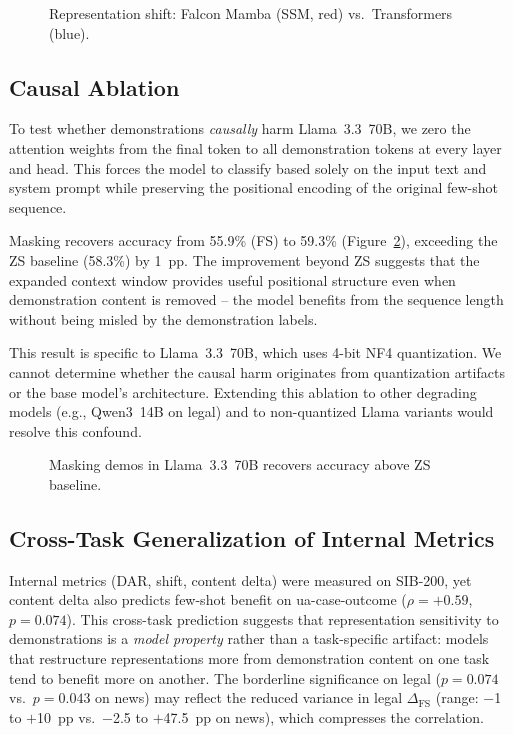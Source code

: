 \documentclass[11pt,a4paper]{article}
\begin{document}
\begin{figure}[t]
\centering

\caption{Representation shift: Falcon Mamba (SSM, red) vs.\ Transformers (blue).}
\label{fig:shift}
\end{figure}

\subsection{Causal Ablation}

To test whether demonstrations \emph{causally} harm Llama~3.3~70B, we zero the attention weights from the final token to all demonstration tokens at every layer and head. This forces the model to classify based solely on the input text and system prompt while preserving the positional encoding of the original few-shot sequence.

Masking recovers accuracy from 55.9\% (FS) to 59.3\% (Figure~\ref{fig:ablation}), exceeding the ZS baseline (58.3\%) by 1~pp. The improvement beyond ZS suggests that the expanded context window provides useful positional structure even when demonstration content is removed -- the model benefits from the sequence length without being misled by the demonstration labels.

This result is specific to Llama~3.3~70B, which uses 4-bit NF4 quantization. We cannot determine whether the causal harm originates from quantization artifacts or the base model's architecture. Extending this ablation to other degrading models (e.g., Qwen3~14B on legal) and to non-quantized Llama variants would resolve this confound.

\begin{figure}[t]
\centering

\caption{Masking demos in Llama~3.3~70B recovers accuracy above ZS baseline.}
\label{fig:ablation}
\end{figure}

\subsection{Cross-Task Generalization of Internal Metrics}

Internal metrics (DAR, shift, content delta) were measured on SIB-200, yet content delta also predicts few-shot benefit on ua-case-outcome ($\rho = +0.59$, $p = 0.074$). This cross-task prediction suggests that representation sensitivity to demonstrations is a \emph{model property} rather than a task-specific artifact: models that restructure representations more from demonstration content on one task tend to benefit more on another. The borderline significance on legal ($p = 0.074$ vs.\ $p = 0.043$ on news) may reflect the reduced variance in legal $\Delta_{\text{FS}}$ (range: $-$1 to $+$10~pp vs.\ $-$2.5 to $+$47.5~pp on news), which compresses the correlation.
\end{document}
